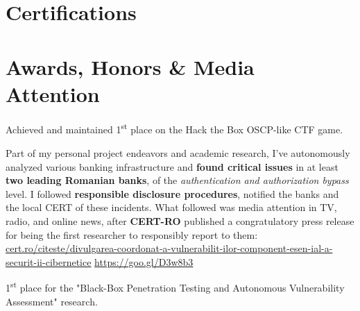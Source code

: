 \documentclass[11pt,a4paper,sans]{moderncv}
\renewcommand*{\httplink}[2][]{%
	\ifthenelse{\equal{#1}{}}%
	{\href{https://#2}{#2}}%
	{\href{https://#2}{#1}}}
\begin{document}
\section{Certifications}


\section{Awards, Honors \& Media Attention}

	\vspace{-2pt} {\small{Achieved and maintained 1\textsuperscript{st} place on the Hack the Box OSCP-like CTF game.}}

	\vspace{4pt}

	\vspace{-2pt} {\small{Part of my personal project endeavors and academic research, I've autonomously analyzed various banking infrastructure and \textbf{found critical issues} in at least \textbf{two leading Romanian banks}, of the \textit{authentication and authorization bypass} level. I followed \textbf{responsible disclosure procedures}, notified the banks and the local CERT of these incidents. What followed was media attention in TV, radio, and online news, after \textbf{CERT-RO} published a congratulatory press release for being the first researcher to responsibly report to them: \httplink[https://goo.gl/D3w8b3]{cert.ro/citeste/divulgarea-coordonat-a-vulnerabilit-ilor-component-esen-ial-a-securit-ii-cibernetice}}}

	\vspace{4pt}

	\vspace{-2pt} {\small{1\textsuperscript{st} place for the "Black-Box Penetration Testing and Autonomous Vulnerability Assessment" research.}}
\end{document}
